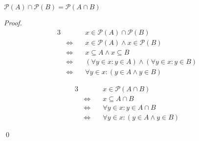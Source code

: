 \documentclass[11pt]{llncs}
\begin{document}
\begin{lemma}
  $\mathcal{P}(A) \cap \mathcal{P}(B) = \mathcal{P}(A \cap B)$
\end{lemma}
\begin{proof}
  \begin{minipage}[t]{0.49\textwidth}
    \begin{alignat*}{3}
                           && x \in \mathcal{P}(A) \cap \mathcal{P}(B)\\
      &\Leftrightarrow\quad & x \in \mathcal{P}(A) \land x \in \mathcal{P}(B)\\
      &\Leftrightarrow\quad & x \subseteq A \land x \subseteq B\\
      &\Leftrightarrow\quad & (\forall y \in x: y \in A) \land (\forall y \in x: y \in B)\\
      &\Leftrightarrow\quad & \forall y \in x: (y \in A \land y \in B)
    \end{alignat*}
  \end{minipage}
  \textwidth
  \vline
  \textwidth
  \begin{minipage}[t]{0.45\textwidth}
    \begin{alignat*}{3}
                           && x \in \mathcal{P}(A \cap B)\\
      &\Leftrightarrow\quad & x \subseteq A \cap B\\
      &\Leftrightarrow\quad & \forall y \in x: y \in A \cap B\\
      &\Leftrightarrow\quad & \forall y \in x: (y \in A \land y \in B)
    \end{alignat*}
  \end{minipage}
  \qed
\end{proof}
\end{document}
